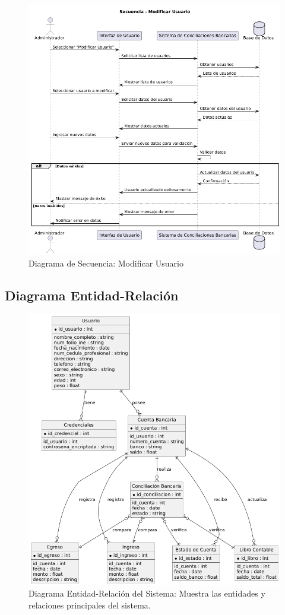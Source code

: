 \documentclass{article}
\begin{document}
\begin{figure}
    \centering
    \includegraphics[width=\textwidth]{secuencia/ModificarUsuario.png}
    \caption{Diagrama de Secuencia: Modificar Usuario}
\end{figure}


\newpage
\subsection{Diagrama Entidad-Relación}
\begin{figure}[H]
    \centering
    \includegraphics[width=\textwidth]{casos/EntidadRelacion.png}
    \caption{Diagrama Entidad-Relación del Sistema: Muestra las entidades y relaciones principales del sistema.}
\end{figure}
\end{document}
